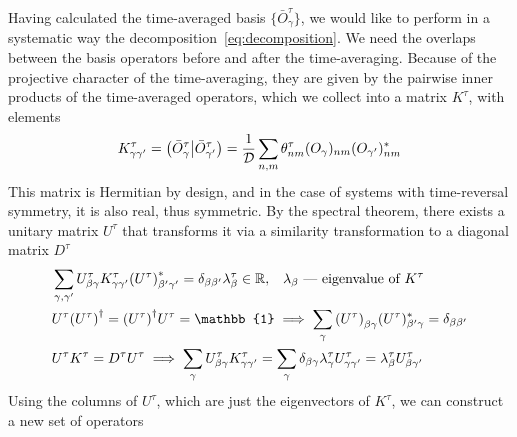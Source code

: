 Having calculated the time-averaged basis \( \{\bar{O}_{\gamma}^{\tau}\} \), we would like to perform in a
systematic way the decomposition~\ref{eq:decomposition}. We need the overlaps between the basis operators
before and after the time-averaging. Because of the projective character of the time-averaging, they are
given by the pairwise inner products of the time-averaged operators, which we collect into a matrix
\(K^{\tau}\), with elements
\begin{equation}
  K^{\tau}_{\gamma\gamma^{\prime}} = \left(\bar{O}_{\gamma}^{\tau} \middle| \bar{O}_{\gamma^{\prime}}^{\tau}\right) = \frac{1}{\mathcal{D}}\sum_{n,m} \theta_{nm}^{\tau} (O_{\gamma})_{nm} (O_{\gamma^{\prime}})_{nm}^{\ast}
  \label{eq:overlap_matrix}
\end{equation}
This matrix is Hermitian by design, and in the case of systems with time-reversal symmetry, it is also real,
thus symmetric. By the spectral theorem, there exists a unitary matrix \(U^{\tau}\) that transforms it
via a similarity transformation to a diagonal matrix \(D^{\tau}\)
\begin{align}
   & \sum_{\gamma,\gamma^{\prime}} U^{\tau}_{\beta \gamma} K_{\gamma\gamma^{\prime}}^{\tau} {(U^{\tau})}_{\beta^{\prime} \gamma^{\prime}}^{\ast}=\delta_{\beta\beta^{\prime}} \lambda^{\tau}_{\beta} \in
  \RR,\;\;\; \lambda_{\beta} \text{ --- eigenvalue of }K^{\tau} \label{eq:property diag}                                                                                                                                                                                                             \\
   & U^{\tau}{(U^{\tau})}^{\dag} = {(U^{\tau})}^{\dag}U^{\tau} = \mathbb{1} \implies \sum_{\gamma} {(U^{\tau})}_{\beta\gamma}(U^{\tau})_{\beta^{\prime}\gamma}^{\ast} =
  \delta_{\beta\beta^{\prime}} \label{eq:propery_ortho}                                                                                                                                                                                                                                              \\
   & U^{\tau} K^{\tau} = D^{\tau} U^{\tau} \implies \sum_{\gamma} U^{\tau}_{\beta\gamma} K_{\gamma\gamma^{\prime}}^{\tau} = \sum_{\gamma}  \delta_{\beta\gamma} \lambda^{\tau}_{\gamma} U^{\tau}_{\gamma\gamma^{\prime}} = \lambda^{\tau}_{\beta} U^{\tau}_{\beta\gamma^{\prime}}\label{eq:property}
\end{align}
Using the columns of \(U^{\tau}\), which are just the eigenvectors of \(K^{\tau}\), we can construct a new set of operators

